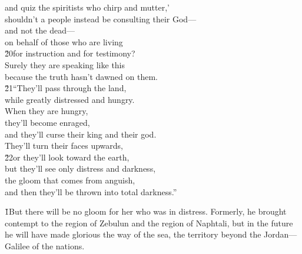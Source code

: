\begin{poetry}
\poemll    and quiz the spiritists who chirp and mutter,' \\
\poeml shouldn't a people instead be consulting their God--- \\
\poemll    and not the dead--- \\
\poeml on behalf of those who are living \\
\poeml \v{20}for instruction and for testimony? \\
\poemll    Surely they are speaking like this \\
\poemlll       because the truth hasn't dawned on them. \\
\poeml \v{21}``They'll pass through the land, \\
\poemll    while greatly distressed and hungry. \\
\poeml When they are hungry, \\
\poemll    they'll become enraged, \\
\poeml and they'll curse their king and their god. \\
\poemll    They'll turn their faces upwards, \\
\poeml \v{22}or they'll look toward the earth, \\
\poemll    but they'll see only distress and darkness, \\
\poeml the gloom that comes from anguish, \\
\poemll    and then they'll be thrown into total darkness.''
\end{poetry}

\v{1}But there will be no gloom for her who was in distress. Formerly, he brought contempt to the region of Zebulun and the region of Naphtali, but in the future he will have made glorious the way of the sea, the territory beyond the Jordan---Galilee of the nations.

